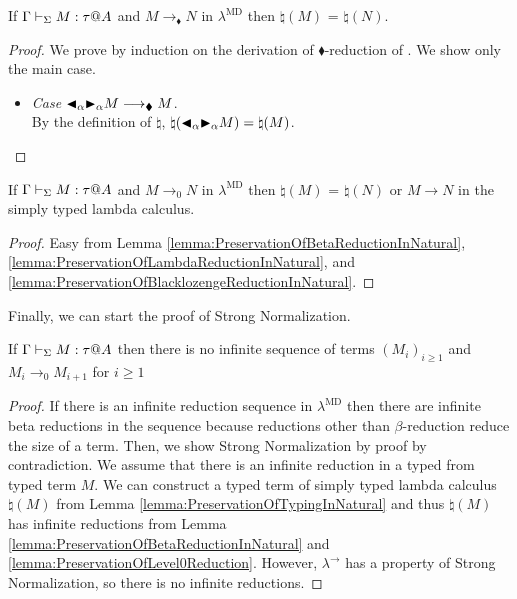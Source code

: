 \begin{lemma}
    \label{lemma:PreservationOfBlacklozengeReductionInNatural}
    If $\G \V M:\tau@A$ and $M \longrightarrow_\blacklozenge N$ in $\lambda^{\text{MD}}$
    then $\natural(M)$ =  $\natural(N)$.
\end{lemma}

\begin{proof}
    We prove by induction on the derivation of $\blacklozenge$-reduction of \LMD.
    We show only the main case.
    \begin{itemize}
        \item \textit{Case} \( {\mathop{\blacktriangleleft}}_\alpha {\mathop{\blacktriangleright}}_\alpha M \longrightarrow_\blacklozenge M \).\\
            By the definition of $\natural$, \(\natural({\mathop{\blacktriangleleft}}_\alpha {\mathop{\blacktriangleright}}_\alpha M) = \natural(M)\).
    \end{itemize}
\end{proof}

\begin{lemma}
    \label{lemma:PreservationOfLevel0Reduction}
    If $\G \V M:\tau@A$ and $M \longrightarrow_0 N$ in $\lambda^{\text{MD}}$
    then $\natural(M)$ =  $\natural(N)$ or \( M \longrightarrow N \) in the simply typed lambda calculus.
\end{lemma}

\begin{proof}
    Easy from Lemma \ref{lemma:PreservationOfBetaReductionInNatural},
    \ref{lemma:PreservationOfLambdaReductionInNatural}, and
    \ref{lemma:PreservationOfBlacklozengeReductionInNatural}.
\end{proof}

Finally, we can start the proof of Strong Normalization.

\begin{lemma}
    \label{lemma:StrongNormalizationofLevel0Reduction}
    If \( \G\V M:\tau@A \) then there is no infinite sequence of terms $(M_i)_{i\ge1}$ and $M_i \longrightarrow_{0} M_{i+1}$ for $i\ge 1$
\end{lemma}

\begin{proof}
    If there is an infinite reduction sequence in $\lambda^{\text{MD}}$ then
    there are infinite beta reductions in the sequence because reductions other
    than $\beta$-reduction reduce the size of a term.  Then, we show Strong
    Normalization by proof by contradiction.  We assume that there is an
    infinite reduction in a typed \LMD from typed term $M$.  We can construct a
    typed term of simply typed lambda calculus $\natural(M)$ from Lemma
    \ref{lemma:PreservationOfTypingInNatural} and thus $\natural(M)$ has
    infinite reductions from Lemma
    \ref{lemma:PreservationOfBetaReductionInNatural} and
    \ref{lemma:PreservationOfLevel0Reduction}. However, $\lambda^\to$ has a
    property of Strong Normalization\cite{TAPL}, so there is no infinite
    reductions.
\end{proof}

